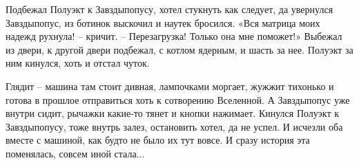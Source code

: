 \documentclass[ebook,oneside,final,openright]{memoir}
\begin{document}
Подбежал Полуэкт к Завздыпопусу, хотел стукнуть как следует, да увернулся Завздыпопус, из ботинок выскочил и наутек бросился. «Вся матрица моих надежд рухнула! – кричит. – Перезагрузка! Только она мне поможет!» Выбежал из двери, к другой двери подбежал, с котлом ядерным, и шасть за нее. Полуэкт за ним кинулся, хоть и отстал чуток.\par
\par
Глядит – машина там стоит дивная, лампочками моргает, жужжит тихонько и готова в прошлое отправиться хоть к сотворению Вселенной. А Завздыпопус уже внутри сидит, рычажки какие-то тянет и кнопки нажимает. Кинулся Полуэкт к Завздыпопусу, тоже внутрь залез, остановить хотел, да не успел. И исчезли оба вместе с машиной, как будто не было их тут вовсе. И сразу история эта поменялась, совсем иной стала...\par
\end{document}
